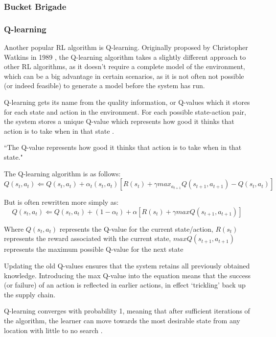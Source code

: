 \documentclass[a4paper,oneside]{report}
\begin{document}
\subsubsection{Bucket Brigade}

\subsubsection{Q-learning}

Another popular RL algorithm is Q-learning. Originally proposed by Christopher Watkins in 1989 \cite{Watkins:1989mi}, the Q-learning algorithm takes a slightly different approach to other RL algorithms, as it doesn't require a complete model of the environment, which can be a big advantage in certain scenarios, as it is not often not possible (or indeed feasible) to generate a model before the system has run.

Q-learning gets its name from the quality information, or Q-values which it stores for each state and action in the environment. For each possible state-action pair, the system stores a unique Q-value which represents how good it thinks that action is to take when in that state .

``The Q-value represents how good it thinks that action is to take when in that state."

\noindent The Q-learning algorithm is as follows:
\begin{equation*}
	Q(s_t,a_t) \Leftarrow Q(s_t, a_t) + \alpha_t(s_t, a_t)[R(s_t) + \gamma max_{a_{t+1}} Q(s_{t+1}, a_{t+1}) - Q(s_t, a_t)]
\end{equation*}

\noindent But is often rewritten more simply as:
\begin{equation*}
	Q(s_t,a_t) \Leftarrow Q(s_t, a_t) + (1 -\alpha_t) + \alpha[R(s_t) + \gamma max Q(s_{t+1}, a_{t+1})]
\end{equation*}

Where $Q(s_t, a_t)$ represents the Q-value for the current state/action, $R(s_t)$ represents the reward associated with the current state, $max Q(s_{t+1}, a_{t+1})$ represents the maximum possible Q-value for the next state

Updating the old Q-values ensures that the system retains all previously obtained knowledge. Introducing the max Q-value into the equation means that the success (or failure) of an action is reflected in earlier actions, in effect `trickling' back up the supply chain.

Q-learning converges with probability 1, meaning that after sufficient iterations of the algorithm, the learner can move towards the most desirable state from any location with little to no search .
\end{document}
